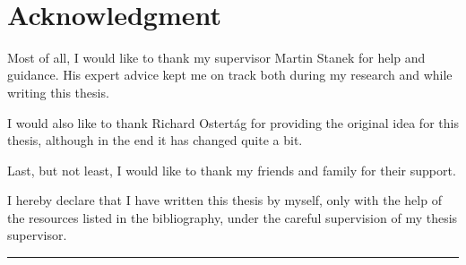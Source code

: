 ~\vspace{3cm}
\section*{Acknowledgment}

Most of all, I would like to thank my supervisor Martin Stanek for help and guidance.
His expert advice kept me on track both during my research and while writing this thesis.

I would also like to thank Richard Ostert\'ag for providing the original idea for this thesis, although in the end it has changed quite a bit.

Last, but not least, I would like to thank my friends and family for their support.

\vfill

\noindent I hereby declare that I have written this thesis by myself, only with the help of the resources listed in the bibliography, under the careful supervision of my thesis supervisor.

\vspace{1cm}

\hfill
\begin{minipage}{6cm}
\hrule\medskip \centering \small \textit{\settingsAuthor}
\end{minipage}

\vspace{3cm}
